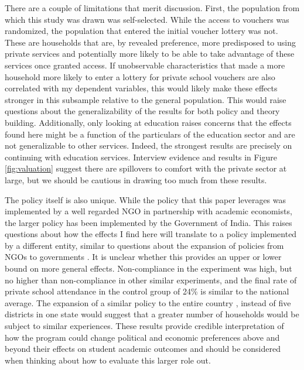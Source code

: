 \documentclass[hidelinks, 12pt, titlepage]{article}
\begin{document}
	There are a couple of limitations that merit discussion.  First, the population from which this study was drawn was self-selected.  While the access to vouchers was randomized, the population that entered the initial voucher lottery was not.  These are households that are, by revealed preference, more predisposed to using private services and potentially more likely to be able to take advantage of these services once granted access.  If unobservable characteristics that made a more household more likely to enter a lottery for private school vouchers are also correlated with my dependent variables, this would likely make these effects stronger in this subsample relative to the general population. This would raise questions about the generalizability of the results for both policy and theory building. Additionally, only looking at education raises concerns that the effects found here might be a function of the particulars of the education sector and are not generalizable to other services.  Indeed, the strongest results are precisely on continuing with education services.  Interview evidence and results in Figure \ref{fig:valuation} suggest there are spillovers to comfort with the private sector at large, but we should be cautious in drawing too much from these results.
	
	The policy itself is also unique.  While the policy that this paper leverages was implemented by a well regarded NGO in partnership with academic economists, the larger policy has been implemented by the Government of India.  This raises questions about how the effects I find here will translate to a policy implemented by a different entity, similar to questions about the expansion of policies from NGOs to governments \citep{Banerjee2017}.  It is unclear whether this provides an upper or lower bound on more general effects.  Non-compliance in the experiment was high, but no higher than non-compliance in other similar experiments, and the final rate of private school attendance in the control group of 24\% is similar to the national average. The expansion of a similar policy to the entire country \citep{GovernmentofIndia2009}, instead of five districts in one state would suggest that a greater number of households would be subject to similar experiences. These results provide credible interpretation of how the program could change political and economic preferences above and beyond their effects on student academic outcomes and should be considered when thinking about how to evaluate this larger role out.
\end{document}
